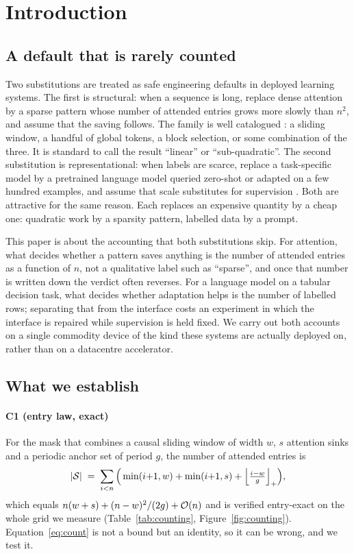 \section{Introduction}\label{sec:intro}

\subsection{A default that is rarely counted}

Two substitutions are treated as safe engineering defaults in deployed learning
systems. The first is structural: when a sequence is long, replace dense
attention by a sparse pattern whose number of attended entries grows more slowly
than $n^2$, and assume that the saving follows. The family is well catalogued
\cite{beltagy2020longformer,zaheer2020bigbird,zhou2021informer,tay2022efficient}:
a sliding window, a handful of global tokens, a block selection, or some
combination of the three. It is standard to call the result ``linear'' or
``sub-quadratic''. The second substitution is representational: when labels are
scarce, replace a task-specific model by a pretrained language model queried
zero-shot or adapted on a few hundred examples, and assume that scale substitutes
for supervision \cite{hegselmann2023tabllm}. Both are attractive for the same
reason. Each replaces an expensive quantity by a cheap one: quadratic work by a
sparsity pattern, labelled data by a prompt.

This paper is about the accounting that both substitutions skip. For attention,
what decides whether a pattern saves anything is the number of attended entries
as a function of $n$, not a qualitative label such as ``sparse'', and once that
number is written down the verdict often reverses. For a language model on a
tabular decision task, what decides whether adaptation helps is the number of
labelled rows; separating that from the interface costs an experiment in which
the interface is repaired while supervision is held fixed. We carry out both
accounts on a single commodity device of the kind these systems are actually
deployed on, rather than on a datacentre accelerator.

\subsection{What we establish}

\paragraph{C1 (entry law, exact)} For the mask that combines a causal sliding
window of width $w$, $s$ attention sinks and a periodic anchor set of period
$g$, the number of attended entries is
\begin{equation}
\lvert \mathcal{S} \rvert \;=\; \sum_{i<n}\Big( \min(i{+}1,w) + \min(i{+}1,s)
+ \Big\lfloor \tfrac{i-w}{g} \Big\rfloor_{+} \Big),
\label{eq:count}
\end{equation}
which equals $n(w+s) + (n-w)^2/(2g) + \mathcal{O}(n)$ and is verified entry-exact on
the whole grid we measure (Table~\ref{tab:counting}, Figure~\ref{fig:counting}).
Equation~\eqref{eq:count} is not a bound but an identity, so it can be wrong,
and we test it.

